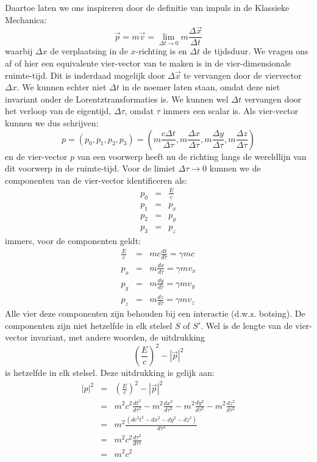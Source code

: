 Daartoe laten we ons inspireren door de definitie van impuls in de Klassieke Mechanica: 
\[
\vec{p} = m\vec{v} = \lim_{\Delta t \rightarrow 0} m\frac{\Delta \vec{x}}{\Delta t}
\]
waarbij $\Delta x$ de verplaatsing in de $x$-richting is en $\Delta t$
de tijdsduur. We vragen ons af of hier een equivalente vier-vector van
te maken is in de vier-dimensionale ruimte-tijd. Dit is inderdaad
mogelijk door $\Delta \vec{x}$ te vervangen door de viervector $\Delta x$.
We kunnen echter niet $\Delta t$ in de noemer laten staan, omdat deze niet invariant onder de Lorentztransformaties is. We kunnen wel $\Delta t$ vervangen door het verloop van de eigentijd, $\Delta \tau$,
omdat $\tau$ immers een scalar is. Als vier-vector kunnen we dus schrijven:
\begin{equation}
p =(p_0,p_1,p_2,p_3) =  \left( m\frac{c\Delta t}{\Delta \tau}, m \frac{\Delta x}{\Delta \tau}
, m \frac{\Delta y}{\Delta \tau}, m \frac{\Delta z}{\Delta \tau}\right)
\end{equation}
en de vier-vector $p$ van  een voorwerp heeft nu de richting langs de wereldlijn van dit
voorwerp in de ruimte-tijd. Voor de limiet $\Delta \tau\rightarrow 0$ kunnen we de componenten
van de vier-vector identificeren als:
\begin{eqnarray}
p_0 & = & \frac{E}{c} \\
p_1 & = & p_x \\
p_2 & = & p_y \\
p_3 & = & p_z 
\end{eqnarray}
immers, voor de componenten geldt:
\begin{eqnarray}
\frac{E}{c} & = & m c \frac{dt}{d\tau} = \gamma m c\\
p_x & = & m \frac{dx}{d\tau} = \gamma mv_x \\
p_y & = & m \frac{dy}{d\tau} = \gamma mv_y \\
p_z & = & m \frac{dz}{d\tau} = \gamma mv_z 
\end{eqnarray}
Alle vier deze componenten zijn behouden bij een interactie (d.w.z.
botsing). De componenten zijn niet hetzelfde in elk stelsel $S$ of
$S'$. Wel is de lengte van de vier-vector invariant, met andere
woorden, de uitdrukking
\begin{equation}
\left(\frac{E}{c}\right)^2 - |\vec{p}|^2 
\end{equation}
is hetzelfde in elk stelsel. Deze uitdrukking is gelijk aan:
\begin{eqnarray}\nonumber
|p|^2 & = &  \left(\frac{E}{c}\right)^2 - |\vec{p}|^2  \\
      & = & m^2c^2 \frac{dt^2}{d\tau^2}-m^2\frac{dx^2}{d\tau^2}-m^2\frac{dy^2}{d\tau^2}-m^2\frac{dz^2}{d\tau^2}\\ \nonumber
      & = & m^2\frac{\left(d c^2 t^2 - dx^2 - dy^2 - dz^2\right)}{d\tau^2} \\ \nonumber
      & = & m^2 c^2 \frac{d\tau^2}{d\tau^2} \\ \nonumber
      & = & m^2 c^2
\end{eqnarray}
